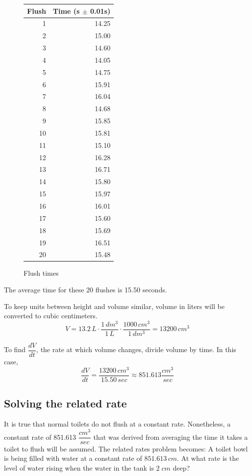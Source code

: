 \documentclass[12pt, titlepage]{article}
\begin{document}
\begin{figure}[H]
\begin{center}
	\caption{Flush times}
\begin{tabular}{rr}
Flush & Time (s \(\pm\) 0.01s)\\
\hline
1 & 14.25\\
2 & 15.00\\
3 & 14.60\\
4 & 14.05\\
5 & 14.75\\
6 & 15.91\\
7 & 16.04\\
8 & 14.68\\
9 & 15.85\\
10 & 15.81\\
11 & 15.10\\
12 & 16.28\\
13 & 16.71\\
14 & 15.80\\
15 & 15.97\\
16 & 16.01\\
17 & 15.60\\
18 & 15.69\\
19 & 16.51\\
20 & 15.48\\
\end{tabular}
\end{center}
\end{figure}

The average time for these 20 flushes is 15.50 seconds. 

To keep units between height and volume similar, volume in liters will be converted to cubic centimeters.
\begin{equation*}
  V = 13.2 \, L \cdot \frac{1 \, dm^{3}}{1 \,L} \cdot \frac{1000 \,cm^{3}}{1 \,dm^{3}} = 13200 \,cm^{3} 
\end{equation*}

To find \(\dfrac{dV}{dt}\), the rate at which volume changes, divide volume by time. In this case,
\begin{equation*}
  \dfrac{dV}{dt} = \dfrac{13200 \,cm^{3}}{15.50 \,sec} \approx 851.613 \dfrac{cm^{3}}{sec}
\end{equation*}

\subsection{Solving the related rate}
It is true that normal toilets do not flush at a constant rate. Nonetheless,  a constant rate of 851.613 \(\dfrac{cm^{3}}{sec}\) that was derived from averaging the time it takes a toilet to flush will be assumed. The related rates problem becomes: A toilet bowl is being filled with water at a constant rate of \(851.613 \, cm\). At what rate is the level of water rising when the water in the tank is \(2 \; cm\) deep?
\end{document}
